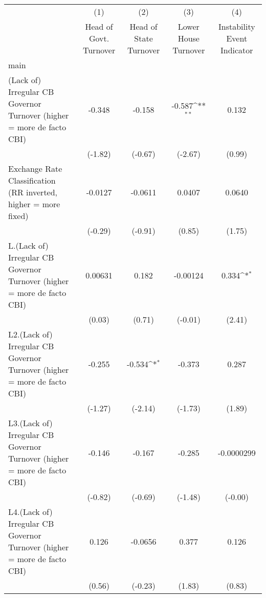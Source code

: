 {
\def\sym#1{\ifmmode^{#1}\else\(^{#1}\)\fi}
\begin{longtable}{l*{4}{c}}
\hline\hline\endfirsthead\hline\endhead\hline\endfoot\endlastfoot
                &\multicolumn{1}{c}{(1)}&\multicolumn{1}{c}{(2)}&\multicolumn{1}{c}{(3)}&\multicolumn{1}{c}{(4)}\\
                &\multicolumn{1}{c}{Head of Govt. Turnover}&\multicolumn{1}{c}{Head of State Turnover}&\multicolumn{1}{c}{Lower House Turnover}&\multicolumn{1}{c}{Instability Event Indicator}\\
\hline
main            &                  &                  &                  &                  \\
(Lack of) Irregular CB Governor Turnover (higher = more de facto CBI)&   -0.348         &   -0.158         &   -0.587\sym{**} &    0.132         \\
                &  (-1.82)         &  (-0.67)         &  (-2.67)         &   (0.99)         \\
[1em]
Exchange Rate Classification (RR inverted, higher = more fixed)&  -0.0127         &  -0.0611         &   0.0407         &   0.0640         \\
                &  (-0.29)         &  (-0.91)         &   (0.85)         &   (1.75)         \\
[1em]
L.(Lack of) Irregular CB Governor Turnover (higher = more de facto CBI)&  0.00631         &    0.182         & -0.00124         &    0.334\sym{*}  \\
                &   (0.03)         &   (0.71)         &  (-0.01)         &   (2.41)         \\
[1em]
L2.(Lack of) Irregular CB Governor Turnover (higher = more de facto CBI)&   -0.255         &   -0.534\sym{*}  &   -0.373         &    0.287         \\
                &  (-1.27)         &  (-2.14)         &  (-1.73)         &   (1.89)         \\
[1em]
L3.(Lack of) Irregular CB Governor Turnover (higher = more de facto CBI)&   -0.146         &   -0.167         &   -0.285         &-0.0000299         \\
                &  (-0.82)         &  (-0.69)         &  (-1.48)         &  (-0.00)         \\
[1em]
L4.(Lack of) Irregular CB Governor Turnover (higher = more de facto CBI)&    0.126         &  -0.0656         &    0.377         &    0.126         \\
                &   (0.56)         &  (-0.23)         &   (1.83)         &   (0.83)         \\

\end{longtable}}
